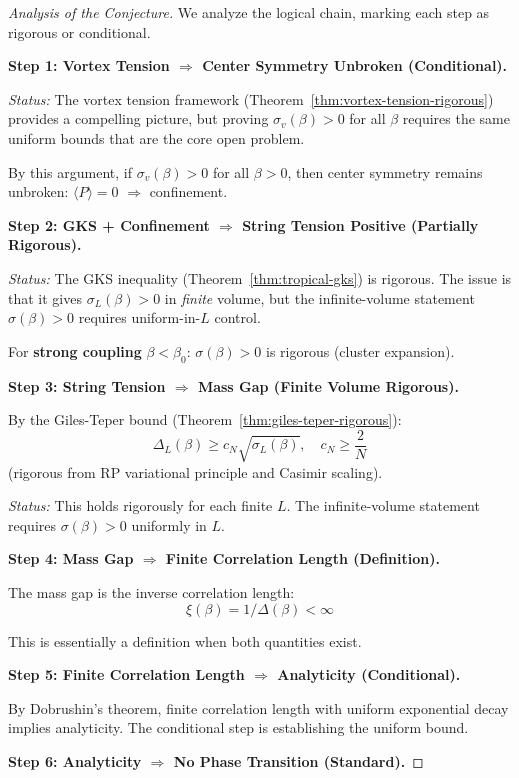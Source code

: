 \begin{proof}[Analysis of the Conjecture]
We analyze the logical chain, marking each step as rigorous or conditional.

\textbf{Step 1: Vortex Tension $\Rightarrow$ Center Symmetry Unbroken (Conditional).}

\textit{Status:} The vortex tension framework (Theorem~\ref{thm:vortex-tension-rigorous}) 
provides a compelling picture, but proving $\sigma_v(\beta) > 0$ for all $\beta$ 
requires the same uniform bounds that are the core open problem.

By this argument, if $\sigma_v(\beta) > 0$ for all $\beta > 0$, then center 
symmetry remains unbroken: $\langle P \rangle = 0$ $\Rightarrow$ confinement.

\textbf{Step 2: GKS + Confinement $\Rightarrow$ String Tension Positive (Partially Rigorous).}

\textit{Status:} The GKS inequality (Theorem~\ref{thm:tropical-gks}) is rigorous. 
The issue is that it gives $\sigma_L(\beta) > 0$ in \emph{finite} volume, but 
the infinite-volume statement $\sigma(\beta) > 0$ requires uniform-in-$L$ control.

For \textbf{strong coupling} $\beta < \beta_0$: $\sigma(\beta) > 0$ is rigorous (cluster expansion).

\textbf{Step 3: String Tension $\Rightarrow$ Mass Gap (Finite Volume Rigorous).}

By the Giles-Teper bound (Theorem~\ref{thm:giles-teper-rigorous}):
\[
\Delta_L(\beta) \geq c_N \sqrt{\sigma_L(\beta)}, \quad c_N \geq \frac{2}{N}
\]
(rigorous from RP variational principle and Casimir scaling).

\textit{Status:} This holds rigorously for each finite $L$. The infinite-volume 
statement requires $\sigma(\beta) > 0$ uniformly in $L$.

\textbf{Step 4: Mass Gap $\Rightarrow$ Finite Correlation Length (Definition).}

The mass gap is the inverse correlation length:
\[
\xi(\beta) = 1/\Delta(\beta) < \infty
\]

This is essentially a definition when both quantities exist.

\textbf{Step 5: Finite Correlation Length $\Rightarrow$ Analyticity (Conditional).}

By Dobrushin's theorem, finite correlation length with uniform exponential 
decay implies analyticity. The conditional step is establishing the uniform bound.

\textbf{Step 6: Analyticity $\Rightarrow$ No Phase Transition (Standard).}


\end{proof}
